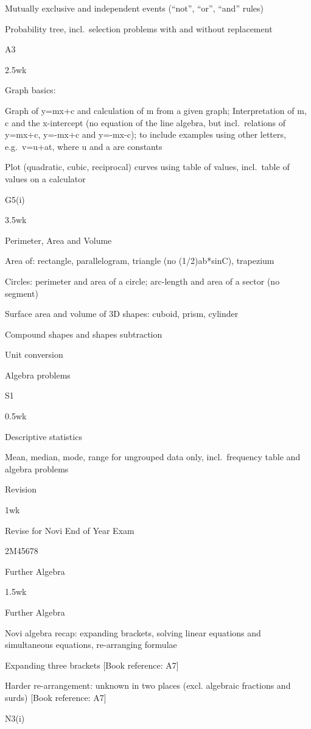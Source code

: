\documentclass[
]{article}
\begin{document}
Mutually exclusive and independent events (``not'', ``or'', ``and''
rules)

Probability tree, incl.~selection problems with and without replacement

A3

2.5wk

Graph basics:

Graph of y=mx+c and calculation of m from a given graph; Interpretation
of m, c and the x-intercept (no equation of the line algebra, but
incl.~relations of y=mx+c, y=-mx+c and y=-mx-c); to include examples
using other letters, e.g.~v=u+at, where u and a are constants

Plot (quadratic, cubic, reciprocal) curves using table of values,
incl.~table of values on a calculator

G5(i)

3.5wk

Perimeter, Area and Volume

Area of: rectangle, parallelogram, triangle (no (1/2)ab*sinC), trapezium

Circles: perimeter and area of a circle; arc-length and area of a sector
(no segment)

Surface area and volume of 3D shapes: cuboid, prism, cylinder

Compound shapes and shapes subtraction

Unit conversion

Algebra problems

S1

0.5wk

Descriptive statistics

Mean, median, mode, range for ungrouped data only, incl.~frequency table
and algebra problems

Revision

1wk

Revise for Novi End of Year Exam

2M45678

Further Algebra

1.5wk

Further Algebra

Novi algebra recap: expanding brackets, solving linear equations and
simultaneous equations, re-arranging formulae

Expanding three brackets {[}Book reference: A7{]}

Harder re-arrangement: unknown in two places (excl. algebraic fractions
and surds) {[}Book reference: A7{]}

N3(i)
\end{document}
